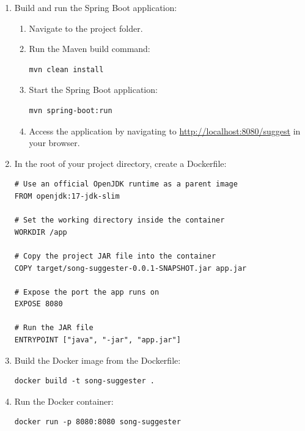 \documentclass[a4paper,11pt]{article}
\begin{document}
\begin{enumerate}
    \item   Build and run the Spring Boot application:
            \begin{enumerate}[label=\roman*.]
                \item   Navigate to the project folder.
                \item   Run the Maven build command:
                        \begin{verbatim}
mvn clean install
                        \end{verbatim}
                \item   Start the Spring Boot application:
                        \begin{verbatim}
mvn spring-boot:run
                        \end{verbatim}
                \item   Access the application by navigating to \url{http://localhost:8080/suggest} in your browser.
            \end{enumerate}

            \item   In the root of your project directory, create a Dockerfile:
                    \begin{verbatim}
# Use an official OpenJDK runtime as a parent image
FROM openjdk:17-jdk-slim

# Set the working directory inside the container
WORKDIR /app

# Copy the project JAR file into the container
COPY target/song-suggester-0.0.1-SNAPSHOT.jar app.jar

# Expose the port the app runs on
EXPOSE 8080

# Run the JAR file
ENTRYPOINT ["java", "-jar", "app.jar"]
                    \end{verbatim}

    \item   Build the Docker image from the Dockerfile:
            \begin{verbatim}
docker build -t song-suggester .
            \end{verbatim}

    \item   Run the Docker container:
            \begin{verbatim}
docker run -p 8080:8080 song-suggester
            \end{verbatim}
\end{enumerate}
\end{document}
